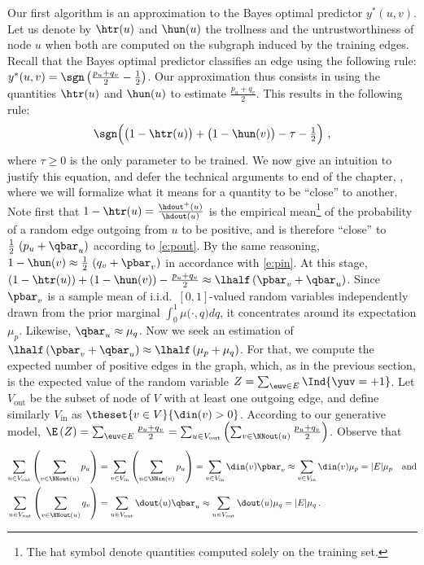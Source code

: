 Our first algorithm is an approximation to the Bayes optimal predictor $y^*(u,v)$. Let us denote by
$\htr(u)$ and $\hun(u)$ the trollness and the untrustworthiness of node $u$ when both are computed
on the subgraph induced by the training edges.
Recall that the Bayes optimal predictor classifies an edge \euv{} using the following rule:
$y^*(u,v) = \sgn\left( \frac{p_u+q_v}{2} - \frac{1}{2} \right)$. Our approximation thus consists in
using the quantities $\htr(u)$ and $\hun(u)$ to estimate $\frac{p_u+q_v}{2}$. This results in the
following rule:
\begin{equation}
  \label{eq:predictor}
  \sgn\Big(\big(1-\htr(u)\big) + \big(1-\hun(v)\big) - \tau - \tfrac{1}{2}\Big)~,
\end{equation}
where $\tau \ge 0$ is the only parameter to be trained. We now give an intuition to justify this
equation, and defer the technical arguments to end of the chapter,
, where we will formalize what it means for a quantity to be
\enquote{close} to another. Note first that $1-\htr(u) = \frac{\hdout^+(u)}{\hdout(u)}$ is the
empirical mean\footnote{The hat symbol denote quantities computed solely on the training set.} of
the probability of a random edge outgoing from $u$ to be positive, and is therefore \enquote{close}
to $\frac{1}{2}\,\left(p_u + \qbar_u\right)$ according to \eqref{e:pout}. By the same reasoning,
$1-\hun(v) \approx \frac{1}{2}\,\left(q_v + \pbar_v\right)$ in accordance with \eqref{e:pin}. At
this stage, $\left( 1 - \htr(u) \right) + \left( 1 - \hun(v) \right) - \frac{p_u+q_v}{2} \approx
\lhalf \left( \pbar_v + \qbar_u \right)$. Since $\pbar_v$ is a sample mean of i.i.d.~$[0,1]$-valued
random variables independently drawn from the prior marginal $\int_0^1 \mu\big(\cdot, q\big) dq$, it
concentrates around its expectation $\mu_p$. Likewise, $\qbar_u \approx \mu_q$. Now we seek an
estimation of $ \lhalf \left( \pbar_v + \qbar_u \right) \approx \lhalf \left( \mu_p + \mu_q
\right)$. For that, we compute the expected number of positive edges in the graph, which, as in the
previous section, is the expected value of the random variable $Z = \sum_{\euv \in E} \Ind{\yuv =
+1}$. Let $V_{\mathrm{out}}$ be the subset of node of $V$ with at least one outgoing edge, and
define similarly $V_{\mathrm{in}}$ as $\theset{v\in V}{\din(v) > 0}$. According to our generative
model, $\E\left(Z \right) = \sum_{\euv \in E} \frac{p_u+q_v}{2} = \sum_{u \in V_{\mathrm{out}}}
\left( \sum_{v \in \NNout(u)} \frac{p_u+q_v}{2} \right)$. Observe that
\begin{align*}
  \sum_{u \in V_{\mathrm{out}}} \left( \sum_{v \in \NNout(u)} p_u \right) &=
  \sum_{v \in V_{\mathrm{in}}} \left( \sum_{u \in \NNin(v)} p_u \right) =
  \sum_{v \in V_{\mathrm{in}}} \din(v) \pbar_v \approx
  \sum_{v \in V_{\mathrm{in}}} \din(v) \mu_p = |E| \mu_p \label{eq:troll_mup}\quad \text{and} \\
  \sum_{u \in V_{\mathrm{out}}} \left( \sum_{v \in \NNout(u)} q_v \right) &=
  \sum_{u \in V_{\mathrm{out}}} \dout(u) \qbar_u \approx
  \sum_{u \in V_{\mathrm{out}}} \dout(u) \mu_q = |E| \mu_q \,.%
\end{align*}
